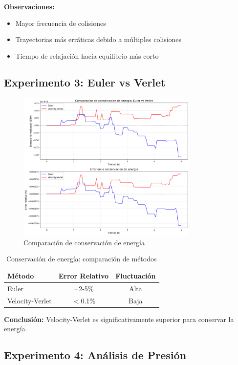 \documentclass[12pt,a4paper]{article}
\begin{document}
\textbf{Observaciones:}
\begin{itemize}
    \item Mayor frecuencia de colisiones
    \item Trayectorias más erráticas debido a múltiples colisiones
    \item Tiempo de relajación hacia equilibrio más corto
\end{itemize}

\subsection{Experimento 3: Euler vs Verlet}

\begin{figure}[H]
\centering
\includegraphics[width=0.8\textwidth]{../results/comparacion_metodos.png}
\caption{Comparación de conservación de energía}
\end{figure}

\begin{table}[H]
\centering
\caption{Conservación de energía: comparación de métodos}
\begin{tabular}{|l|c|c|}
\hline
\textbf{Método} & \textbf{Error Relativo} & \textbf{Fluctuación} \\
\hline
Euler & $\sim$2-5\% & Alta \\
Velocity-Verlet & $<$0.1\% & Baja \\
\hline
\end{tabular}
\end{table}

\textbf{Conclusión:} Velocity-Verlet es significativamente superior para conservar la energía.

\subsection{Experimento 4: Análisis de Presión}
\end{document}
